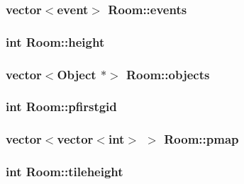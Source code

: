 \hypertarget{class_room_a881d5a108a9a3aba5f44279ebbd8a4f9}{
\subsubsection[{events}]{\setlength{\rightskip}{0pt plus 5cm}vector$<$event$>$ Room\-::events\hspace{0.3cm}{\ttfamily [protected]}}}\label{class_room_a881d5a108a9a3aba5f44279ebbd8a4f9}
\hypertarget{class_room_ab7d56b80d9eeefca79a2e83447ad4d66}{
\subsubsection[{height}]{\setlength{\rightskip}{0pt plus 5cm}int Room\-::height\hspace{0.3cm}{\ttfamily [protected]}}}\label{class_room_ab7d56b80d9eeefca79a2e83447ad4d66}
\hypertarget{class_room_a6495b4a5cd0ea4979fcfbbb27c6b419e}{
\subsubsection[{objects}]{\setlength{\rightskip}{0pt plus 5cm}vector$<${\bf Object} $\ast$$>$ Room\-::objects\hspace{0.3cm}{\ttfamily [protected]}}}\label{class_room_a6495b4a5cd0ea4979fcfbbb27c6b419e}
\hypertarget{class_room_ac6125cd56db3bf38d2f44158159b3899}{
\subsubsection[{pfirstgid}]{\setlength{\rightskip}{0pt plus 5cm}int Room\-::pfirstgid\hspace{0.3cm}{\ttfamily [protected]}}}\label{class_room_ac6125cd56db3bf38d2f44158159b3899}
\hypertarget{class_room_a37b095fddfc6230033ed1de7afd9ec8d}{
\subsubsection[{pmap}]{\setlength{\rightskip}{0pt plus 5cm}vector$<$vector$<$int$>$ $>$ Room\-::pmap\hspace{0.3cm}{\ttfamily [protected]}}}\label{class_room_a37b095fddfc6230033ed1de7afd9ec8d}
\hypertarget{class_room_ae7a9ba3c048cd82f2335f8da3e7dbe17}{
\subsubsection[{tileheight}]{\setlength{\rightskip}{0pt plus 5cm}int Room\-::tileheight\hspace{0.3cm}{\ttfamily [protected]}}}\label{class_room_ae7a9ba3c048cd82f2335f8da3e7dbe17}

